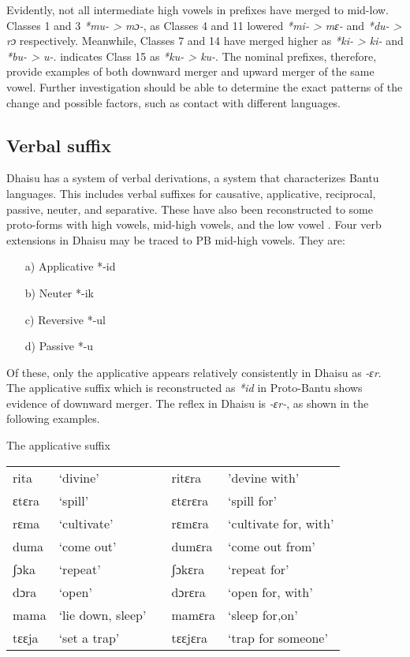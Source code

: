 \documentclass[output=paper,colorlinks,citecolor=brown]{langscibook}
\begin{document}
Evidently, not all intermediate high vowels in prefixes have merged to mid-low. Classes 1 and 3 \textit{*mu- > mɔ-}, as Classes 4 and 11 lowered \textit{*mi- > mɛ-} and \textit{*du- > rɔ} respectively. Meanwhile, Classes 7  and 14 have merged higher as \textit{*ki- > ki-} and \textit{*bu- > u-}. \citet[32]{Nurse2000}  indicates Class 15 as \textit{*ku- > ku-}. The nominal prefixes, therefore, provide examples of both downward merger and upward merger of the same vowel. Further investigation should be able to determine the exact patterns of the change and possible factors, such as contact with different languages.

\subsection{Verbal suffix}\label{sec:ngonyani:4.2}

Dhaisu has a system of verbal derivations, a system that characterizes Bantu languages. This includes verbal suffixes for causative, applicative, reciprocal, passive, neuter, and separative. These have also been reconstructed to some proto-forms with high vowels, mid-high vowels, and the low vowel \citep{Meeussen1967}. Four verb extensions in Dhaisu may be traced to PB mid-high vowels. They are:

\begin{enumerate}
    \item[a)] Applicative *-id
    \item[b)] Neuter *-ik
    \item[c)] Reversive *-ul
    \item[d)] Passive *-u
\end{enumerate}

Of these, only the applicative appears relatively consistently in Dhaisu as \textit{-ɛr}. The applicative suffix which is reconstructed as \textit{*id} in Proto-Bantu \citet[92]{Meeussen1967} shows evidence of downward merger. The reflex in Dhaisu is \textit{-ɛr-}, as shown in the following examples.

\ea
    The applicative suffix\\
    \label{tab:ngonyani:15}
    \begin{tabular}{@{}l l l l l@{}}
        rita &  `divine' & & ritɛra & 'devine with' \\
        ɛtɛra & `spill' & & ɛtɛrɛra & `spill for'\\
        rɛma & `cultivate' & & rɛmɛra & `cultivate for, with'\\
        duma & `come out' & & dumɛra & `come out from'\\
        ʃɔka & `repeat' & & ʃɔkɛra & `repeat for'\\
        dɔra & `open' & & dɔrɛra & `open for, with'\\
        mama & `lie down, sleep' & & mamɛra & `sleep for,on'\\
        tɛɛja & `set a trap' & & tɛɛjɛra & `trap for someone'\\
    \end{tabular}
\z
\end{document}
